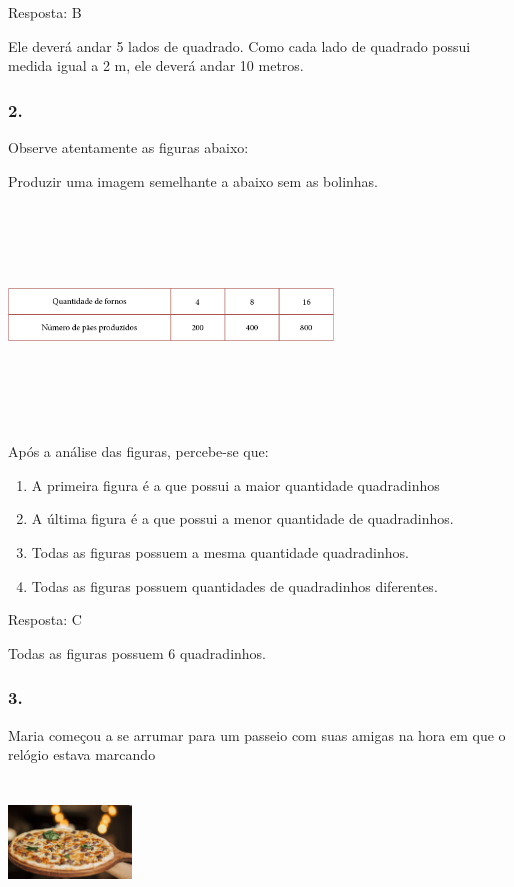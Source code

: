 Resposta: B

Ele deverá andar 5 lados de quadrado. Como cada lado de quadrado possui
medida igual a 2 m, ele deverá andar 10 metros.

\subsubsection{2.}\label{section-63}

Observe atentamente as figuras abaixo:

Produzir uma imagem semelhante a abaixo sem as bolinhas.

\includegraphics[width=3.39196in,height=2.27520in]{media/image71.png}

Após a análise das figuras, percebe-se que:

\begin{enumerate}
\def\labelenumi{\alph{enumi})}
\item
  A primeira figura é a que possui a maior quantidade quadradinhos
\item
  A última figura é a que possui a menor quantidade de quadradinhos.
\item
  Todas as figuras possuem a mesma quantidade quadradinhos.
\item
  Todas as figuras possuem quantidades de quadradinhos diferentes.
\end{enumerate}

Resposta: C

Todas as figuras possuem 6 quadradinhos.

\subsubsection{3.}\label{section-64}

Maria começou a se arrumar para um passeio com suas amigas na hora em
que o relógio estava marcando

\includegraphics[width=1.29487in,height=1.32633in]{media/image72.png}

